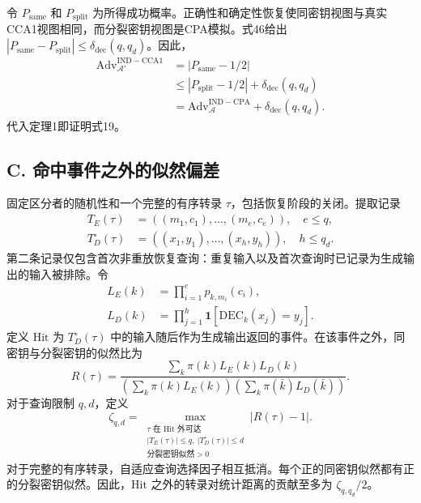 \documentclass[UTF8,a4paper,zihao=-4,fontset=windows,openany]{ctexbook}
\begin{document}
令 \(P_{\mathrm{same}}\) 和 \(P_{\mathrm{split}}\) 为所得成功概率。正确性和确定性恢复使同密钥视图与真实CCA1视图相同，而分裂密钥视图是CPA模拟。式46给出 \(|P_{\mathrm{same}} - P_{\mathrm{split}}| \le \delta_{\mathrm{dec}}(q, q_d)\)。因此，
\begin{equation}
\begin{aligned}
\mathrm{Adv}_{\mathcal{A}'}^{\mathrm{IND-CCA1}} &= |P_{\mathrm{same}} - 1/2| \\
&\le |P_{\mathrm{split}} - 1/2| + \delta_{\mathrm{dec}}(q, q_d) \\
&= \mathrm{Adv}_{\mathcal{A}}^{\mathrm{IND-CPA}} + \delta_{\mathrm{dec}}(q, q_d).
\end{aligned} \tag{47}
\end{equation}
代入定理1即证明式19。

\subsection*{C. 命中事件之外的似然偏差}

固定区分者的随机性和一个完整的有序转录 \(\tau\)，包括恢复阶段的关闭。提取记录
\begin{equation}
\begin{aligned}
T_E(\tau) &= ((m_1, c_1), \ldots, (m_e, c_e)), \quad e \le q, \\
T_D^\circ(\tau) &= ((x_1, y_1), \ldots, (x_h, y_h)), \quad h \le q_d.
\end{aligned} \tag{48}
\end{equation}
第二条记录仅包含首次非重放恢复查询：重复输入以及首次查询时已记录为生成输出的输入被排除。令
\begin{equation}
\begin{aligned}
L_E(k) &= \prod_{i=1}^e p_{k,m_i}(c_i), \\
L_D(k) &= \prod_{j=1}^h \mathbf{1}[\mathrm{DEC}_k(x_j) = y_j].
\end{aligned} \tag{49}
\end{equation}
定义 \(\mathrm{Hit}\) 为 \(T_D^\circ(\tau)\) 中的输入随后作为生成输出返回的事件。在该事件之外，同密钥与分裂密钥的似然比为
\begin{equation}
R(\tau) = \frac{\sum_k \pi(k) L_E(k) L_D(k)}{\left( \sum_k \pi(k) L_E(k) \right) \left( \sum_k \pi(\bar{k}) L_D(\bar{k}) \right)}. \tag{50}
\end{equation}
对于查询限制 \(q, d\)，定义
\begin{equation}
\zeta_{q,d} = \max_{\substack{\tau \text{ 在 Hit 外可达} \\ |T_E(\tau)| \le q, \ |T_D^\circ(\tau)| \le d \\ \text{分裂密钥似然} > 0}} |R(\tau) - 1|. \tag{51}
\end{equation}
对于完整的有序转录，自适应查询选择因子相互抵消。每个正的同密钥似然都有正的分裂密钥似然。因此，\(\mathrm{Hit}\) 之外的转录对统计距离的贡献至多为 \(\zeta_{q, q_d} / 2\)。
\end{document}

